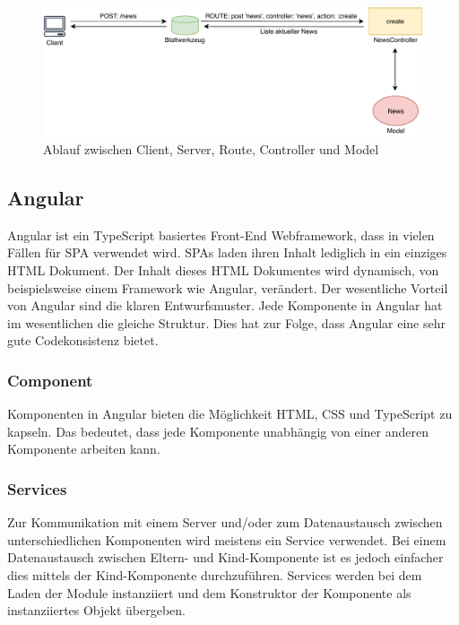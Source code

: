 \begin{figure}[h]
	\includegraphics[width=\textwidth]{graphics/rails-mvc.pdf}
	\caption{Ablauf zwischen Client, Server, Route, Controller und Model}
	\label{fig:rails-mvc}
\end{figure}

\subsection{Angular}
\label{sec: angular}
Angular ist ein TypeScript basiertes Front-End Webframework, dass in vielen Fällen für \gls{SPA} verwendet wird. \gls{SPA}s laden ihren Inhalt lediglich in ein einziges \gls{HTML} Dokument. Der Inhalt dieses \gls{HTML} Dokumentes wird dynamisch, von beispielsweise einem Framework wie Angular, verändert. Der wesentliche Vorteil von Angular sind die klaren Entwurfsmuster. Jede Komponente in Angular hat im wesentlichen die gleiche Struktur. Dies hat zur Folge, dass Angular eine sehr gute Codekonsistenz bietet.


\subsubsection{Component}
\label{sec: ang-component}
Komponenten in Angular bieten die Möglichkeit \gls{HTML}, \gls{CSS} und TypeScript zu kapseln. Das bedeutet, dass jede Komponente unabhängig von einer anderen Komponente arbeiten kann.

\subsubsection{Services}
\label{sec: ang-service}
Zur Kommunikation mit einem Server und/oder zum Datenaustausch zwischen unterschiedlichen Komponenten wird meistens ein Service verwendet. Bei einem Datenaustausch zwischen Eltern- und Kind-Komponente ist es jedoch einfacher dies mittels der Kind-Komponente durchzuführen. Services werden bei dem Laden der Module instanziiert und dem Konstruktor der Komponente als instanziiertes Objekt übergeben.

